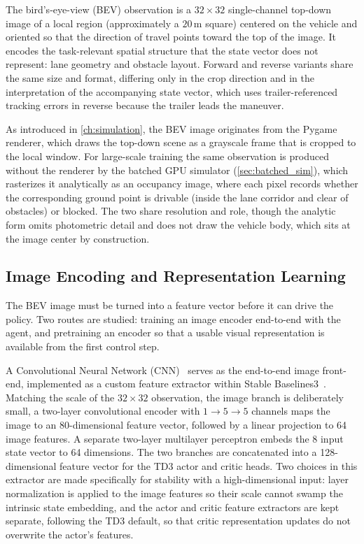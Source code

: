 The bird's-eye-view (BEV) observation is a $32 \times 32$ single-channel top-down image of a local region (approximately a $20$\,m square) centered on the vehicle and oriented so that the direction of travel points toward the top of the image. It encodes the task-relevant spatial structure that the state vector does not represent: lane geometry and obstacle layout. Forward and reverse variants share the same size and format, differing only in the crop direction and in the interpretation of the accompanying state vector, which uses trailer-referenced tracking errors in reverse because the trailer leads the maneuver.

As introduced in \cref{ch:simulation}, the BEV image originates from the Pygame renderer, which draws the top-down scene as a grayscale frame that is cropped to the local window. For large-scale training the same observation is produced without the renderer by the batched GPU simulator (\cref{sec:batched_sim}), which rasterizes it analytically as an occupancy image, where each pixel records whether the corresponding ground point is drivable (inside the lane corridor and clear of obstacles) or blocked. The two share resolution and role, though the analytic form omits photometric detail and does not draw the vehicle body, which sits at the image center by construction.

\subsection{Image Encoding and Representation Learning}

The BEV image must be turned into a feature vector before it can drive the policy. Two routes are studied: training an image encoder end-to-end with the agent, and pretraining an encoder so that a usable visual representation is available from the first control step.

A Convolutional Neural Network (CNN)~\cite{lecun1998gradient} serves as the end-to-end image front-end, implemented as a custom feature extractor within Stable Baselines3~\cite{raffin2021sb3}. Matching the scale of the $32 \times 32$ observation, the image branch is deliberately small, a two-layer convolutional encoder with $1 \rightarrow 5 \rightarrow 5$ channels maps the image to an 80-dimensional feature vector, followed by a linear projection to 64 image features. A separate two-layer multilayer perceptron embeds the 8 input state vector to 64 dimensions. The two branches are concatenated into a 128-dimensional feature vector for the TD3 actor and critic heads. Two choices in this extractor are made specifically for stability with a high-dimensional input: layer normalization is applied to the image features so their scale cannot swamp the intrinsic state embedding, and the actor and critic feature extractors are kept separate, following the TD3 default, so that critic representation updates do not overwrite the actor's features.

